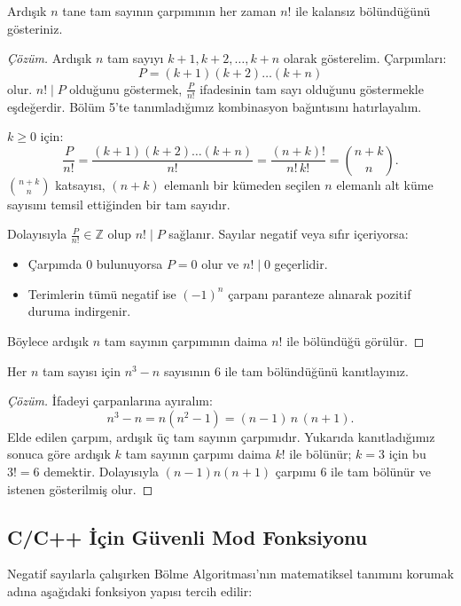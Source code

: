 \begin{example}
Ardışık $n$ tane tam sayının çarpımının her zaman $n!$ ile kalansız bölündüğünü gösteriniz.
\end{example}

\begin{proof}[Çözüm]
Ardışık $n$ tam sayıyı $k+1, k+2, \dots, k+n$ olarak gösterelim. Çarpımları:
\[
P = (k+1)(k+2)\dots(k+n)
\]
olur. $n! \mid P$ olduğunu göstermek, $\frac{P}{n!}$ ifadesinin tam sayı olduğunu göstermekle eşdeğerdir. Bölüm 5'te tanımladığımız kombinasyon bağıntısını hatırlayalım.

$k \ge 0$ için:
\[
\frac{P}{n!} = \frac{(k+1)(k+2)\dots(k+n)}{n!} = \frac{(n+k)!}{n! \, k!} = \binom{n+k}{n}.
\]
$\binom{n+k}{n}$ katsayısı, $(n+k)$ elemanlı bir kümeden seçilen $n$ elemanlı alt küme sayısını temsil ettiğinden bir tam sayıdır. 

Dolayısıyla $\frac{P}{n!} \in \mathbb{Z}$ olup $n! \mid P$ sağlanır. Sayılar negatif veya sıfır içeriyorsa:
\begin{itemize}
    \item Çarpımda 0 bulunuyorsa $P = 0$ olur ve $n! \mid 0$ geçerlidir.
    \item Terimlerin tümü negatif ise $(-1)^n$ çarpanı paranteze alınarak pozitif duruma indirgenir.
\end{itemize}
Böylece ardışık $n$ tam sayının çarpımının daima $n!$ ile bölündüğü görülür.
\end{proof}

\begin{example}
Her $n$ tam sayısı için $n^3 - n$ sayısının $6$ ile tam bölündüğünü kanıtlayınız.
\end{example}

\begin{proof}[Çözüm]
İfadeyi çarpanlarına ayıralım:
\[
n^3 - n = n(n^2 - 1) = (n - 1)\,n\,(n + 1).
\]
Elde edilen çarpım, ardışık üç tam sayının çarpımıdır. Yukarıda kanıtladığımız
sonuca göre ardışık $k$ tam sayının çarpımı daima $k!$ ile bölünür; $k = 3$ için bu
$3! = 6$ demektir. Dolayısıyla $(n-1)n(n+1)$ çarpımı $6$ ile tam bölünür ve istenen
gösterilmiş olur.
\end{proof}

\subsection{C/C++ İçin Güvenli Mod Fonksiyonu}

Negatif sayılarla çalışırken Bölme Algoritması'nın matematiksel tanımını korumak adına aşağıdaki fonksiyon yapısı tercih edilir:

